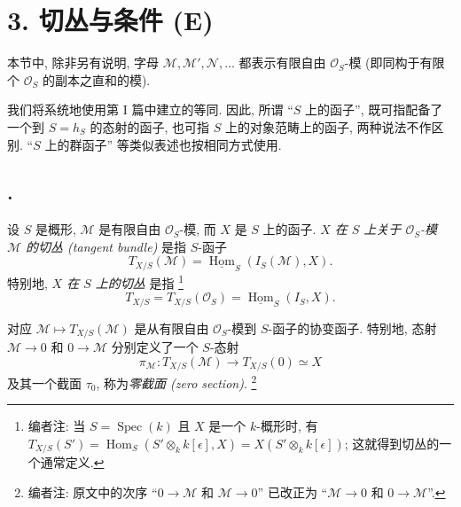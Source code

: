 
\section*{3. 切丛与条件 (E)}

本节中, 除非另有说明, 字母
\(\mathcal M,\mathcal M',\mathcal N,\ldots\) 都表示有限自由
\(\mathcal O_S\)-模 (即同构于有限个 \(\mathcal O_S\) 的副本之直和的模).

我们将系统地使用第 I 篇中建立的等同. 因此, 所谓 ``\(S\) 上的函子'',
既可指配备了一个到 \(S=h_S\) 的态射的函子, 也可指
\(S\) 上的对象范畴上的函子, 两种说法不作区别.
``\(S\) 上的群函子'' 等类似表述也按相同方式使用.

\subsection*{.}
设 \(S\) 是概形, \(\mathcal M\) 是有限自由
\(\mathcal O_S\)-模, 而 \(X\) 是 \(S\) 上的函子.
\emph{\(X\) 在 \(S\) 上关于 \(\mathcal O_S\)-模 \(\mathcal M\)
的切丛 (tangent bundle)} 是指 \(S\)-函子
\[
  T_{X/S}(\mathcal M)
  =\underline{\operatorname{Hom}}_S(I_S(\mathcal M),X).
\]
特别地, \emph{\(X\) 在 \(S\) 上的切丛} 是指
\footnote{编者注: 当 \(S=\operatorname{Spec}(k)\) 且 \(X\) 是一个
\(k\)-概形时, 有
\(T_{X/S}(S')=\operatorname{Hom}_S(S'\otimes_k k[\epsilon],X)
=X(S'\otimes_k k[\epsilon])\); 这就得到切丛的一个通常定义.}
\[
  T_{X/S}=T_{X/S}(\mathcal O_S)
  =\underline{\operatorname{Hom}}_S(I_S,X).
\]

对应 \(\mathcal M\mapsto T_{X/S}(\mathcal M)\) 是从有限自由
\(\mathcal O_S\)-模到 \(S\)-函子的协变函子.
特别地, 态射 \(\mathcal M\to0\) 和 \(0\to\mathcal M\)
分别定义了一个 \(S\)-态射
\[
  \pi_{\mathcal M}:T_{X/S}(\mathcal M)\longrightarrow
  T_{X/S}(0)\simeq X
\]
及其一个截面 \(\tau_0\), 称为\emph{零截面 (zero section)}.
\footnote{编者注: 原文中的次序 ``\(0\to\mathcal M\) 和
\(\mathcal M\to0\)'' 已改正为 ``\(\mathcal M\to0\) 和
\(0\to\mathcal M\)''.}

